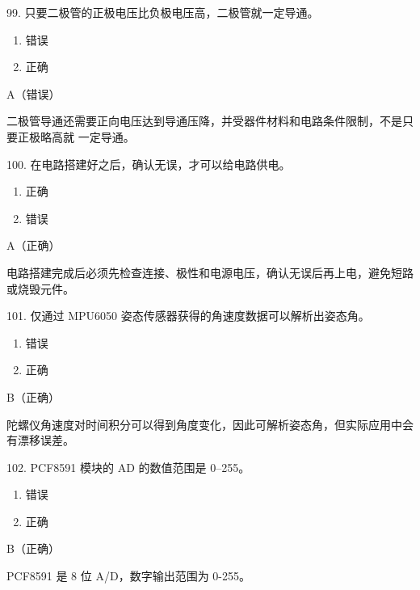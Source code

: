 \begin{question}{99. 只要二极管的正极电压比负极电压高，二极管就一定导通。}
\begin{enumerate}[label=\Alph*., leftmargin=2.4em, itemsep=0.2em]
\item 错误
\item 正确
\end{enumerate}
\end{question}
\begin{answer}
A（错误）
\end{answer}
\begin{explanation}
二极管导通还需要正向电压达到导通压降，并受器件材料和电路条件限制，不是只要正极略高就 一定导通。
\end{explanation}

\begin{question}{100. 在电路搭建好之后，确认无误，才可以给电路供电。}
\begin{enumerate}[label=\Alph*., leftmargin=2.4em, itemsep=0.2em]
\item 正确
\item 错误
\end{enumerate}
\end{question}
\begin{answer}
A（正确）
\end{answer}
\begin{explanation}
电路搭建完成后必须先检查连接、极性和电源电压，确认无误后再上电，避免短路或烧毁元件。
\end{explanation}

\begin{question}{101. 仅通过 MPU6050 姿态传感器获得的角速度数据可以解析出姿态角。}
\begin{enumerate}[label=\Alph*., leftmargin=2.4em, itemsep=0.2em]
\item 错误
\item 正确
\end{enumerate}
\end{question}
\begin{answer}
B（正确）
\end{answer}
\begin{explanation}
陀螺仪角速度对时间积分可以得到角度变化，因此可解析姿态角，但实际应用中会有漂移误差。
\end{explanation}

\begin{question}{102. PCF8591 模块的 AD 的数值范围是 0–255。}
\begin{enumerate}[label=\Alph*., leftmargin=2.4em, itemsep=0.2em]
\item 错误
\item 正确
\end{enumerate}
\end{question}
\begin{answer}
B（正确）
\end{answer}
\begin{explanation}
PCF8591 是 8 位 A/D，数字输出范围为 0-255。
\end{explanation}

